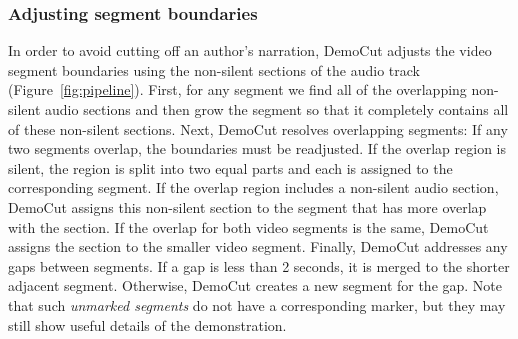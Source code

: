 \subsubsection{Adjusting segment boundaries}

In order to avoid cutting off an author's narration, DemoCut
adjusts the video segment boundaries using the non-silent sections
of the audio track (Figure~\ref{fig:pipeline}). First, for any segment
we find
all of the overlapping non-silent audio sections and then grow the
segment so that it completely contains all of these non-silent sections.
%
Next, DemoCut resolves overlapping segments: If any two segments
overlap,
the boundaries must be readjusted.
%
If the overlap region is silent, the region is split into two equal parts and each is assigned to the
corresponding segment.
%
If the overlap region includes a non-silent audio section,
DemoCut assigns this non-silent section to the segment that has
more overlap with the section. If the overlap for both video segments is the same, DemoCut assigns the section to the smaller video segment.
%
Finally, DemoCut addresses any gaps between segments. If a gap is less
than 2 seconds, it is merged to the shorter adjacent segment.
Otherwise, DemoCut creates a new segment for the gap. Note
that such {\em unmarked segments} do not have a corresponding marker, but
they may still show useful details of the demonstration.


%


